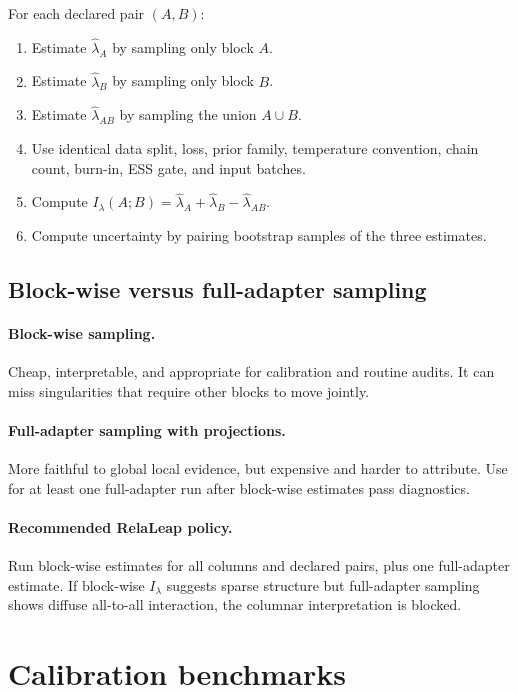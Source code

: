 \documentclass[11pt]{article}
\begin{document}
For each declared pair $(A,B)$:
\begin{enumerate}[(1)]
\item Estimate $\hat\lambda_A$ by sampling only block $A$.
\item Estimate $\hat\lambda_B$ by sampling only block $B$.
\item Estimate $\hat\lambda_{AB}$ by sampling the union $A\cup B$.
\item Use identical data split, loss, prior family, temperature convention, chain count, burn-in, ESS gate, and input batches.
\item Compute $I_\lambda(A;B)=\hat\lambda_A+\hat\lambda_B-\hat\lambda_{AB}$.
\item Compute uncertainty by pairing bootstrap samples of the three estimates.
\end{enumerate}

\subsection{Block-wise versus full-adapter sampling}

\paragraph{Block-wise sampling.}  Cheap, interpretable, and appropriate for calibration and routine audits.  It can miss singularities that require other blocks to move jointly.

\paragraph{Full-adapter sampling with projections.}  More faithful to global local evidence, but expensive and harder to attribute.  Use for at least one full-adapter run after block-wise estimates pass diagnostics.

\paragraph{Recommended RelaLeap policy.}  Run block-wise estimates for all columns and declared pairs, plus one full-adapter estimate.  If block-wise $I_\lambda$ suggests sparse structure but full-adapter sampling shows diffuse all-to-all interaction, the columnar interpretation is blocked.

\section{Calibration benchmarks}
\end{document}
